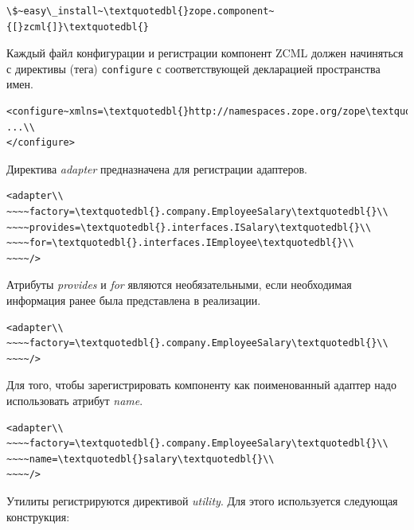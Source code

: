 \documentclass[a4paper,openany,twoside,draft]{book}
\providecommand*{\DUroletitlereference}[1]{\textsl{#1}}
\begin{document}
\begin{verbatim}
\$~easy\_install~\textquotedbl{}zope.component~{[}zcml{]}\textquotedbl{}
\end{verbatim}

Каждый файл конфигурации и регистрации компонент ZCML должен
начиняться с директивы (тега) \texttt{configure} с соответствующей
декларацией пространства имен.

\begin{verbatim}
<configure~xmlns=\textquotedbl{}http://namespaces.zope.org/zope\textquotedbl{}>\\
...\\
</configure>
\end{verbatim}

Директива \DUroletitlereference{adapter} предназначена для регистрации адаптеров.

\begin{verbatim}
<adapter\\
~~~~factory=\textquotedbl{}.company.EmployeeSalary\textquotedbl{}\\
~~~~provides=\textquotedbl{}.interfaces.ISalary\textquotedbl{}\\
~~~~for=\textquotedbl{}.interfaces.IEmployee\textquotedbl{}\\
~~~~/>
\end{verbatim}

Атрибуты \DUroletitlereference{provides} и \DUroletitlereference{for} являются необязательными, если необходимая
информация ранее была представлена в реализации.

\begin{verbatim}
<adapter\\
~~~~factory=\textquotedbl{}.company.EmployeeSalary\textquotedbl{}\\
~~~~/>
\end{verbatim}

Для того, чтобы зарегистрировать компоненту как поименованный адаптер
надо использовать атрибут \DUroletitlereference{name}.

\begin{verbatim}
<adapter\\
~~~~factory=\textquotedbl{}.company.EmployeeSalary\textquotedbl{}\\
~~~~name=\textquotedbl{}salary\textquotedbl{}\\
~~~~/>
\end{verbatim}

Утилиты регистрируются директивой \DUroletitlereference{utility}.  Для этого используется
следующая конструкция:
\end{document}
